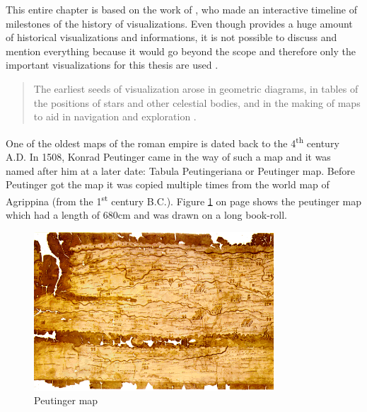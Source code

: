 This entire chapter is based on the work of \citeauthor{Friendly.2001}, who made an interactive timeline of milestones of the history of visualizations. Even though \citeauthor{Friendly.2001} provides a huge amount of historical visualizations and informations, it is not possible to discuss and mention everything because it would go beyond the scope and therefore only the important visualizations for this thesis are used .

\begin{quote}
    The earliest seeds of visualization arose in geometric diagrams, in tables of the positions of stars and other celestial bodies, and in the making of maps to aid in navigation and exploration .
\end{quote}

One of the oldest maps of the roman empire is dated back to the 4\textsuperscript{th} century A.D. In 1508, Konrad Peutinger came in the way of such a map and it was named after him at a later date: Tabula Peutingeriana or Peutinger map. Before Peutinger got the map it was copied multiple times from the world map of Agrippina (from the 1\textsuperscript{st} century B.C.). Figure \ref{fig:peutinger} on page \pageref{fig:peutinger} shows the peutinger map which had a length of 680cm and was drawn on a long book-roll.

\begin{figure}[!htb]
\centering
\includegraphics[width=0.8\textwidth,keepaspectratio]{images/history/peutinger.png}
\caption[
    Peutinger map, Urldate: 07.2016 \newline
\small\texttt{\url{https://web.archive.org/web/20080129123649/http://www.kargi.de/Geschichte/Peutinger/Peutinger.bmp}}
]{Peutinger map}
\label{fig:peutinger}
\end{figure}

